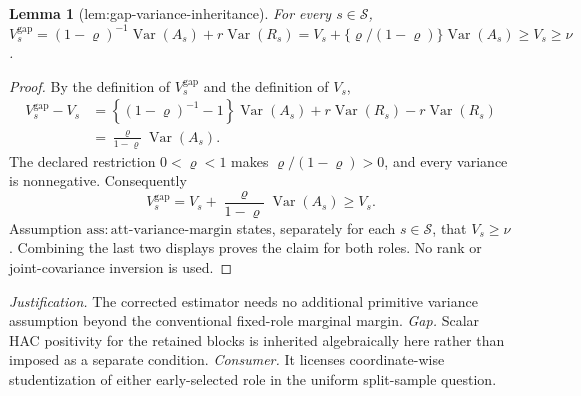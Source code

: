 \documentclass{article}
\newtheorem{lemma}{Lemma}
\begin{document}
\begin{lemma}[lem:gap-variance-inheritance]\label{lem:gap-variance-inheritance}
For every \(s\in\mathcal S\), \(V_s^{\mathrm{gap}}=(1-\varrho)^{-1}\operatorname{Var}(A_s)+r\operatorname{Var}(R_s)=V_s+\{\varrho/(1-\varrho)\}\operatorname{Var}(A_s)\geq V_s\geq\nu\).
\end{lemma}
\begin{proof}
By the definition of \(V_s^{\mathrm{gap}}\) and the definition of \(V_s\),
\[
\begin{aligned}
V_s^{\mathrm{gap}}-V_s
&=\left\{(1-\varrho)^{-1}-1\right\}\operatorname{Var}(A_s)
  +r\operatorname{Var}(R_s)-r\operatorname{Var}(R_s)\\
&=\frac{\varrho}{1-\varrho}\operatorname{Var}(A_s).
\end{aligned}
\]
The declared restriction \(0<\varrho<1\) makes \(\varrho/(1-\varrho)>0\), and every variance is nonnegative.  Consequently
\[
V_s^{\mathrm{gap}}=V_s+\frac{\varrho}{1-\varrho}\operatorname{Var}(A_s)\geq V_s.
\]
Assumption \(\mathrm{ass{:}att\mbox{-}variance\mbox{-}margin}\) states, separately for each \(s\in\mathcal S\), that \(V_s\geq\nu\).  Combining the last two displays proves the claim for both roles.  No rank or joint-covariance inversion is used.
\end{proof}
\par\smallskip\noindent \textit{Justification.} The corrected estimator needs no additional primitive variance assumption beyond the conventional fixed-role marginal margin. \textit{Gap.} Scalar HAC positivity for the retained blocks is inherited algebraically here rather than imposed as a separate condition. \textit{Consumer.} It licenses coordinate-wise studentization of either early-selected role in the uniform split-sample question.
\end{document}
